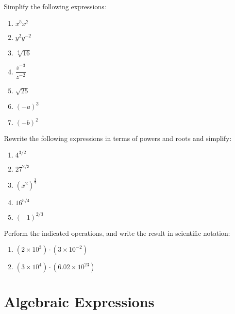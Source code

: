 \documentclass{exam}
\begin{document}
\begin{questions}
\question Simplify the following expressions:

\begin{enumerate}
	\item $x^{5} x^{2}$
	
	\item $y^{2} y^{-2}$
	
	\item $\sqrt[4]{16}$
	
	\item $\dfrac{z^{-3}}{z^{-2}}$
	
	\item $\sqrt{25}$
	
	\item $(-a)^{3}$
	
	\item $(-b)^{2}$
\end{enumerate}
 
 
\question Rewrite the following expressions in terms of powers and roots and simplify:
 	\begin{enumerate}
		\item $4^{3/2}$
		\item $27^{2/3}$
		\item $(x^{2})^\frac{3}{2}$
		\item $16^{5/4}$
		\item $(-1)^{2/3}$
	\end{enumerate}
	
 
\question Perform the indicated operations, and write the result in scientific notation:
	\begin{enumerate}
		\item $(2 \times 10^{3}) \cdot (3 \times 10^{-2})$
		\item $(3 \times 10^{4}) \cdot (6.02 \times 10^{23})$
	\end{enumerate}


\end{questions}

\clearpage

\section*{Algebraic Expressions}
\end{document}
